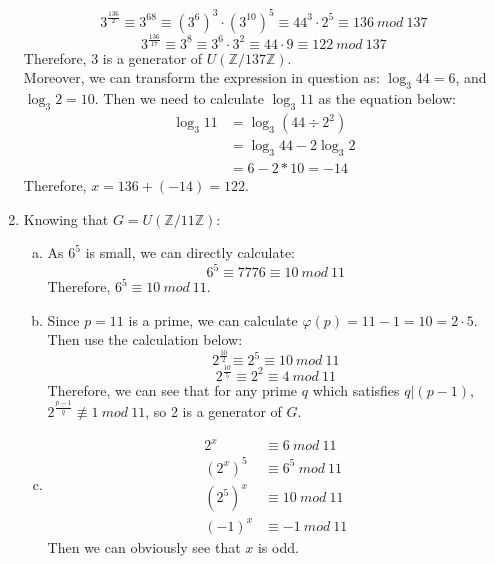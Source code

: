 \documentclass[12pt, a4paper]{article}
\begin{document}
\begin{enumerate}
          $$3^{\frac{136}{2}} \equiv 3^{68} \equiv (3^{6})^3 \cdot (3^10)^5 \equiv 44^3 \cdot 2^5 \equiv 136\ mod\ 137$$
          $$3^{\frac{136}{17}} \equiv 3^{8} \equiv 3^6\cdot 3^2 \equiv 44\cdot 9 \equiv 122\ mod\ 137$$
          Therefore, 3 is a generator of $U(\mathbb{Z}/137\mathbb{Z})$.\\
          Moreover, we can transform the expression in question as: 
          $\log_3 44 = 6$, and $\log_3 2 = 10$. Then we need to calculate $\log_3 11$ as the equation below:
          \begin{align*}
              \log_3 11 &= \log_3 (44 \div 2^2)\\
                        &= \log_3 44 - 2\log_3 2\\
                        &= 6 - 2*10 = -14
          \end{align*}
          Therefore, $x = 136 + (-14) = 122$.
    \item Knowing that $G = U(\mathbb{Z}/11\mathbb{Z})$:
          \begin{enumerate}[(a)]
              \item As $6^5$ is small, we can directly calculate:
                    $$6^5 \equiv 7776 \equiv 10\ mod\ 11$$
                    Therefore, $6^5 \equiv 10\ mod\ 11$.
              \item Since $p = 11$ is a prime, we can calculate $\varphi(p) = 11 - 1 = 10 = 2\cdot 5$. 
                    Then use the calculation below:
                    $$2^{\frac{10}{2}} \equiv 2^5 \equiv 10\ mod\ 11$$
                    $$2^{\frac{10}{5}} \equiv 2^2 \equiv 4\ mod\ 11$$
                    Therefore, we can see that for any prime $q$ which satisfies $q|(p-1)$, 
                    $2^{\frac{p-1}{q}} \not\equiv 1\ mod\ 11$, so 2 is a generator of $G$.
              \item \begin{align*}
                        2^x &\equiv 6\ mod\ 11\\
                        (2^x)^5 &\equiv 6^5\ mod\ 11\\
                        (2^5)^x &\equiv 10\ mod\ 11\\
                        (-1)^x &\equiv -1\ mod\ 11                  
                    \end{align*}
                    Then we can obviously see that $x$ is odd.
          \end{enumerate}

\end{enumerate}
\end{document}
